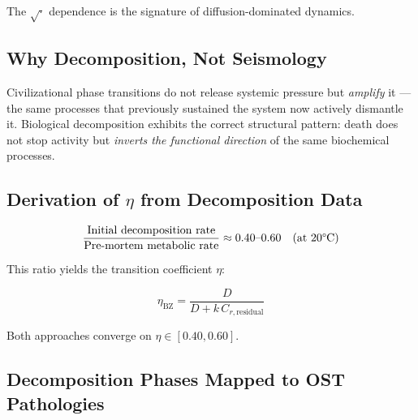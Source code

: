 \documentclass[12pt,a4paper]{article}
\begin{document}
The $\sqrt{\cdot}$ dependence is the signature of diffusion-dominated dynamics.

\subsection{Why Decomposition, Not Seismology}

Civilizational phase transitions do not release systemic pressure but \emph{amplify} it --- the same processes that previously sustained the system now actively dismantle it. Biological decomposition exhibits the correct structural pattern: death does not stop activity but \emph{inverts the functional direction} of the same biochemical processes.

\subsection{Derivation of $\eta$ from Decomposition Data}

\begin{equation}
\frac{\text{Initial decomposition rate}}{\text{Pre-mortem metabolic rate}} \approx 0.40\text{--}0.60 \quad (\text{at 20\textdegree C})
\end{equation}

This ratio yields the transition coefficient $\eta$:

\begin{equation}\label{eq:eta_BZ}
\eta_{\mathrm{BZ}} = \frac{D}{D + k\,C_{r,\mathrm{residual}}}
\end{equation}

Both approaches converge on $\eta \in [0.40, 0.60]$.

\subsection{Decomposition Phases Mapped to OST Pathologies}
\end{document}
